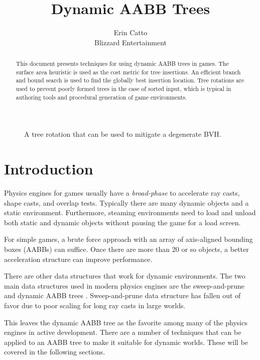 \documentclass{article}
\begin{document}
\title{Dynamic AABB Trees}
\author{Erin Catto\\Blizzard Entertainment}
\maketitle

\begin{figure}
	\begin{center}
	\end{center}
	
	\caption{A tree rotation that can be used to mitigate a degenerate BVH.}
	\label{fig:teaser}
\end{figure}

\begin{abstract}
\small
This document presents techniques for using dynamic AABB trees in games. The surface area heuristic is used as the cost metric for tree insertions. An efficient branch and bound search is used to find the globally best insertion location. Tree rotations are used to prevent poorly formed trees in the case of sorted input, which is typical in authoring tools and procedural generation of game environments.
\end{abstract}

\section{Introduction}
Physics engines for games usually have a \emph{broad-phase} to accelerate ray casts, shape casts, and overlap tests. Typically there are many dynamic objects and a static environment. Furthermore, steaming environments need to load and unload both static and dynamic objects without pausing the game for a load screen.

For simple games, a brute force approach with an array of axis-aligned bounding boxes (AABBs) can suffice. Once there are more than 20 or so objects, a better acceleration structure can improve performance. 

There are other data structures that work for dynamic environments. The two main data structures used in modern physics engines are the sweep-and-prune \cite{Bergen2004} and dynamic AABB trees \cite{Presson2008}. Sweep-and-prune data structure has fallen out of favor due to poor scaling for long ray casts in large worlds.

This leaves the dynamic AABB tree as the favorite among many of the physics engines in active development. There are a number of techniques that can be applied to an AABB tree to make it suitable for dynamic worlds. These will be covered in the following sections.
\end{document}
